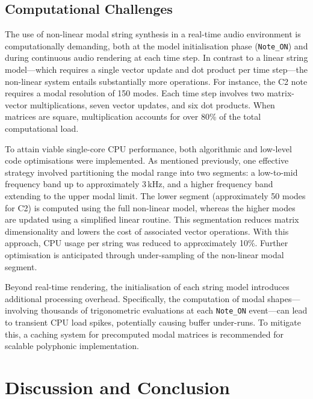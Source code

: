 \subsection{Computational Challenges}

The use of non-linear modal string synthesis in a real-time audio environment is computationally demanding, both at the model initialisation phase (\texttt{Note\_ON}) and during continuous audio rendering at each time step. In contrast to a linear string model—which requires a single vector update and dot product per time step—the non-linear system entails substantially more operations. For instance, the C2 note requires a modal resolution of 150 modes. Each time step involves two matrix-vector multiplications, seven vector updates, and six dot products. When matrices are square, multiplication accounts for over 80\% of the total computational load.

To attain viable single-core CPU performance, both algorithmic and low-level code optimisations were implemented. As mentioned previously, one effective strategy involved partitioning the modal range into two segments: a low-to-mid frequency band up to approximately 3\,kHz, and a higher frequency band extending to the upper modal limit. The lower segment (approximately 50 modes for C2) is computed using the full non-linear model, whereas the higher modes are updated using a simplified linear routine. This segmentation reduces matrix dimensionality and lowers the cost of associated vector operations. With this approach, CPU usage per string was reduced to approximately 10\%. Further optimisation is anticipated through under-sampling of the non-linear modal segment.

Beyond real-time rendering, the initialisation of each string model introduces additional processing overhead. Specifically, the computation of modal shapes—involving thousands of trigonometric evaluations at each \texttt{Note\_ON} event—can lead to transient CPU load spikes, potentially causing buffer under-runs. To mitigate this, a caching system for precomputed modal matrices is recommended for scalable polyphonic implementation.





\section{Discussion and Conclusion}

